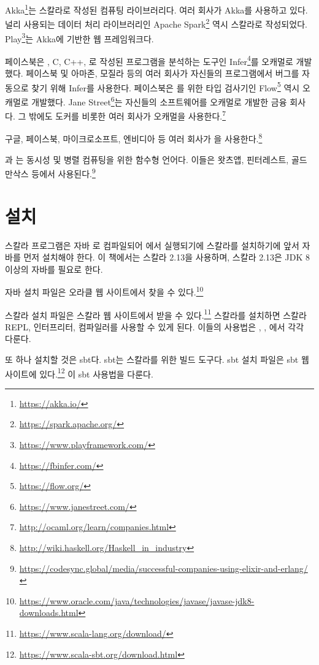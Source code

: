 Akka\footnote{\url{https://akka.io/}}는 스칼라로 작성된
  컴퓨팅 라이브러리다.
여러 회사가 Akka를 사용하고 있다. 널리 사용되는 데이터 처리 라이브러리인 Apache
Spark\footnote{\url{https://spark.apache.org/}} 역시 스칼라로 작성되었다.
Play\footnote{\url{https://www.playframework.com/}}는 Akka에 기반한 웹 프레임워크다.

페이스북은 , C, C++, 로 작성된 프로그램을 분석하는
도구인 Infer\footnote{\url{https://fbinfer.com/}}를 오캐멀로 개발했다. 페이스북 및 아마존, 모질라 등의 여러 회사가
자신들의 프로그램에서 버그를 자동으로 찾기 위해 Infer를 사용한다. 페이스북은
를 위한 타입 검사기인 Flow\footnote{\url{https://flow.org/}} 역시 오캐멀로 개발했다.
Jane Street\footnote{\url{https://www.janestreet.com/}}는 자신들의 소프트웨어를 오캐멀로 개발한 금융 회사다. 그 밖에도 도커를
비롯한 여러 회사가 오캐멀을 사용한다.\footnote{\url{http://ocaml.org/learn/companies.html}}

구글, 페이스북, 마이크로소프트, 엔비디아 등 여러 회사가 을
사용한다.\footnote{\url{http://wiki.haskell.org/Haskell_in_industry}}

과 는 동시성 및 병렬 컴퓨팅을 위한 함수형 언어다.
이들은 왓츠앱, 핀터레스트, 골드만삭스 등에서 사용된다.\footnote{\url{https://codesync.global/media/successful-companies-using-elixir-and-erlang/}}

\section{설치}

스칼라 프로그램은 자바 로 컴파일되어
에서
실행되기에 스칼라를 설치하기에 앞서 자바를 먼저
설치해야 한다. 이 책에서는 스칼라 2.13을 사용하며, 스칼라 2.13은 JDK 8 이상의
자바를 필요로 한다.

자바 설치 파일은 오라클 웹 사이트에서 찾을 수 있다.\footnote{\url{https://www.oracle.com/java/technologies/javase/javase-jdk8-downloads.html}}

스칼라 설치 파일은 스칼라 웹 사이트에서 받을 수 있다.\footnote{\url{https://www.scala-lang.org/download/}}
스칼라를 설치하면 스칼라
REPL, 인터프리터, 컴파일러를 사용할 수 있게 된다. 이들의 사용법은
, , 에서 각각 다룬다.

또 하나 설치할 것은 sbt다. sbt는 스칼라를 위한 빌드 도구다. sbt 설치
파일은 sbt 웹 사이트에 있다.\footnote{\url{https://www.scala-sbt.org/download.html}}
이 sbt 사용법을 다룬다.

